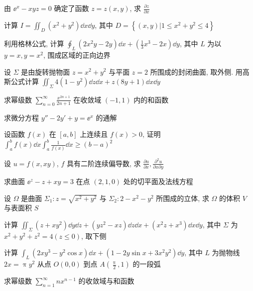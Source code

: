 \begin{ti}[$5$ 分]
	由 $\ee^{x}-x y z=0$ 确定了函数 $z=z(x,y)$, 求 $\frac{\partial z}{\partial x}$
\end{ti}

\begin{ti}[$5$ 分]
	计算 $I=\iint_{D}\left(x^{2}+y^{2}\right) \dd{x} \dd{y}$, 其中 $D=\left\{(x, y) | 1 \leqslant x^{2}+y^{2} \leqslant 4\right\}$
\end{ti}

\begin{ti}[$8$ 分]
	利用格林公式, 计算 $\oint_{L}\left(2 x^{2} y-2 y\right) \dd{x}+\left(\frac{1}{3} x^{3}-2 x\right) \dd{y}$, 其中 $L$ 为以 $y=x,y=x^{2}$, 围成区域的正向边界
\end{ti}

\begin{ti}[$8$ 分]
	设 $\Sigma$ 是由旋转抛物面 $z=x^{2}+y^{2}$ 与平面 $z=2$ 所围成的封闭曲面, 取外侧. 用高斯公式计算 $\iint_{\Sigma} 4\left(1-y^{2}\right) \dd{z} \dd{x}+z(8 y+1) \dd{x} \dd{y}$
\end{ti}

\begin{ti}[$8$ 分]
	求幂级数 $\sum_{n=0}^{\infty} \frac{x^{2 n+1}}{2 n+1}$ 在收敛域 $(-1,1)$ 内的和函数
\end{ti}

\begin{ti}[$8$ 分]
	求微分方程 $y''-2 y'+y=\ee^{x}$ 的通解
\end{ti}

\begin{ti}[$5$ 分]
	设函数 $f(x)$ 在 $[a,b]$ 上连续且 $f(x)>0$, 证明 $\int_{a}^{b} f(x) \dd{x} \int_{a}^{b} \frac{1}{f(x)} \dd{x} \geq(b-a)^{2}$
\end{ti}

\begin{ti}[$7$ 分]
	设 $u=f(x,xy)$, $f$ 具有二阶连续偏导数, 求 $\frac{\partial u}{\partial x},\frac{\partial^2u}{\partial x\partial y}$
\end{ti}

\begin{ti}[$7$ 分]
	求曲面 $\ee^{z}-z+x y=3$ 在点 $(2,1,0)$ 处的切平面及法线方程
\end{ti}

\begin{ti}[$10$ 分]
	设 $\Omega$ 是曲面 $\Sigma_1:z=\sqrt{x^2+y^2}$ 与 $\Sigma_2:2-x^2-y^2$ 所围成的立体, 求 $\Omega$ 的体积 $V$ 与表面积 $S$
\end{ti}

\begin{ti}[$10$ 分]
	计算 $\iint_{\Sigma}\left(z+x y^{2}\right) \dd{y} \dd{z}+\left(y z^{2}-x z\right) \dd{z} \dd{x}+\left(x^{2} z+x^{3}\right) \dd{x} \dd{y}$, 其中 $\Sigma$ 为 $x^{2}+y^{2}+z^{2}=4(z \leqslant 0)$, 取下侧
\end{ti}

\begin{ti}[$10$ 分]
	计算 $\int_{L}\left(2 x y^{3}-y^{2} \cos x\right) \dd{x}+\left(1-2 y \sin x+3 x^{2} y^{2}\right) \dd{y}$, 其中 $L$ 为抛物线 $2x=\uppi y^2$ 从点 $O(0,0)$ 到点 $A\left( \frac{\uppi}{2},1 \right)$ 的一段弧
\end{ti}

\begin{ti}[$8$ 分]
	求幂级数 $\sum_{n=1}^{\infty}nx^{n-1}$ 的收敛域与和函数
\end{ti}